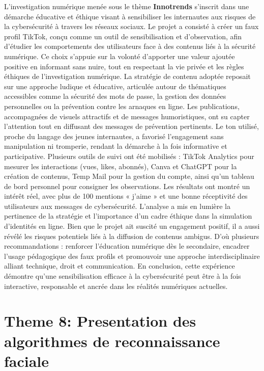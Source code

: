 \documentclass[12pt]{article}
\begin{document}
L’investigation numérique menée sous le thème \textbf{Innotrends} s’inscrit dans une démarche éducative et éthique visant à sensibiliser les internautes aux risques de la cybersécurité à travers les réseaux sociaux. Le projet a consisté à créer un faux profil TikTok, conçu comme un outil de sensibilisation et d’observation, afin d’étudier les comportements des utilisateurs face à des contenus liés à la sécurité numérique. Ce choix s’appuie sur la volonté d’apporter une valeur ajoutée positive en informant sans nuire, tout en respectant la vie privée et les règles éthiques de l’investigation numérique. La stratégie de contenu adoptée reposait sur une approche ludique et éducative, articulée autour de thématiques accessibles comme la sécurité des mots de passe, la gestion des données personnelles ou la prévention contre les arnaques en ligne. Les publications, accompagnées de visuels attractifs et de messages humoristiques, ont su capter l’attention tout en diffusant des messages de prévention pertinents. Le ton utilisé, proche du langage des jeunes internautes, a favorisé l’engagement sans manipulation ni tromperie, rendant la démarche à la fois informative et participative. Plusieurs outils de suivi ont été mobilisés : TikTok Analytics pour mesurer les interactions (vues, likes, abonnés), Canva et ChatGPT pour la création de contenus, Temp Mail pour la gestion du compte, ainsi qu’un tableau de bord personnel pour consigner les observations. Les résultats ont montré un intérêt réel, avec plus de 100 mentions « j’aime » et une bonne réceptivité des utilisateurs aux messages de cybersécurité. L’analyse a mis en lumière la pertinence de la stratégie et l’importance d’un cadre éthique dans la simulation d’identités en ligne. Bien que le projet ait suscité un engagement positif, il a aussi révélé les risques potentiels liés à la diffusion de contenus ambigus. D’où plusieurs recommandations : renforcer l’éducation numérique dès le secondaire, encadrer l’usage pédagogique des faux profils et promouvoir une approche interdisciplinaire alliant technique, droit et communication. En conclusion, cette expérience démontre qu’une sensibilisation efficace à la cybersécurité peut être à la fois interactive, responsable et ancrée dans les réalités numériques actuelles.


\section{Theme 8: Presentation des algorithmes de reconnaissance faciale}
\end{document}
